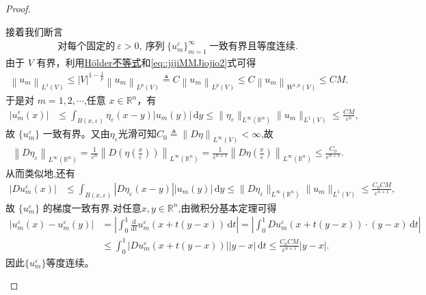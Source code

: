 \documentclass[../../main.tex]{subfiles}
\begin{document}
\begin{proof}
\begin{enumerate}[(1)]
接着我们断言
\begin{align}\label{eq::jijCIOSJIiowj}
\text{对每个固定的}\ \varepsilon>0,\ \text{序列}\ \{u_{m}^{\varepsilon}\}_{m=1}^{\infty}\ \text{一致有界且等度连续}.
\end{align}
由于 $V$ 有界，利用\hyperref[Real Analysis-theorem:实变函数--Hölder不等式]{Hölder不等式}和\eqref{eq::jijiMMJiojio2}式可得
\begin{align*}
\left\| u_m \right\| _{L^1(V)}\leqslant \left| V \right|^{1-\frac{1}{p}}\left\| u_m \right\| _{L^p(V)}\triangleq C\left\| u_m \right\| _{L^p(V)}\leqslant C\left\| u_m \right\| _{W^{1,p}(V)}\leqslant CM.
\end{align*}
于是对 $m=1,2,\cdots$,任意 $x\in\mathbb{R}^{n}$，有
\begin{align*}
|u_{m}^{\varepsilon}(x)|
&\leqslant\int_{B(x,\varepsilon)}\eta_{\varepsilon}(x-y)|u_{m}(y)|\,\mathrm{d}y
\leqslant\|\eta_{\varepsilon}\|_{L^{\infty}(\mathbb{R}^n)}\|u_{m}\|_{L^{1}(V)}
\leqslant\frac{CM}{\varepsilon^{n}},
\end{align*}
故 $\{u_{m}^{\varepsilon}\}$ 一致有界。又由$\eta_\varepsilon$光滑可知$C_0\triangleq \left\| D\eta \right\| _{L^{\infty}(V)}<\infty$,故
\begin{align*}
\left\| D\eta _{\varepsilon} \right\| _{L^{\infty}\left( \mathbb{R} ^n \right)}=\frac{1}{\varepsilon ^n}\left\| D\left( \eta \left( \frac{x}{\varepsilon} \right) \right) \right\| _{L^{\infty}\left( \mathbb{R} ^n \right)}=\frac{1}{\varepsilon ^{n+1}}\left\| D\eta \left( \frac{x}{\varepsilon} \right) \right\| _{L^{\infty}\left( \mathbb{R} ^n \right)}\leqslant \frac{C_0}{\varepsilon ^{n+1}}.
\end{align*}
从而类似地,还有
\begin{align*}
|Du_{m}^{\varepsilon}(x)|
&\leqslant\int_{B(x,\varepsilon)}|D\eta_{\varepsilon}(x-y)||u_{m}(y)|\,\mathrm{d}y
\leqslant\|D\eta_{\varepsilon}\|_{L^{\infty}(\mathbb{R}^n)}\|u_{m}\|_{L^{1}(V)}
\leqslant\frac{C_0CM}{\varepsilon^{n+1}},
\end{align*}
故 $\{u_{m}^{\varepsilon}\}$ 的梯度一致有界.对任意$x,y\in \mathbb{R}^n$,由微积分基本定理可得
\begin{align*}
\left| u_{m}^{\varepsilon}\left( x \right) -u_{m}^{\varepsilon}\left( y \right) \right|&=\left| \int_0^1{\frac{\mathrm{d}}{\mathrm{d}t}u_{m}^{\varepsilon}\left( x+t\left( y-x \right) \right) \,\mathrm{d}t} \right|=\left| \int_0^1{Du_{m}^{\varepsilon}\left( x+t\left( y-x \right) \right) \cdot \left( y-x \right) \,\mathrm{d}t} \right|
\\
&\leqslant \int_0^1{\left| Du_{m}^{\varepsilon}\left( x+t\left( y-x \right) \right) \right|\left| y-x \right|\,\mathrm{d}t}\leqslant \frac{C_0CM}{\varepsilon ^{n+1}}\left| y-x \right|.
\end{align*}
因此$\{u_{m}^{\varepsilon}\}$等度连续。


\end{enumerate}
\end{proof}
\end{document}
